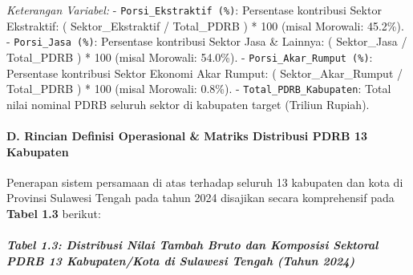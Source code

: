 \documentclass[
]{article}
\begin{document}
\emph{Keterangan Variabel:} - \texttt{Porsi\_Ekstraktif\ (\%)}:
Persentase kontribusi Sektor Ekstraktif: ( Sektor\_Ekstraktif /
Total\_PDRB ) * 100 (misal Morowali: 45.2\%). -
\texttt{Porsi\_Jasa\ (\%)}: Persentase kontribusi Sektor Jasa \&
Lainnya: ( Sektor\_Jasa / Total\_PDRB ) * 100 (misal Morowali: 54.0\%).
- \texttt{Porsi\_Akar\_Rumput\ (\%)}: Persentase kontribusi Sektor
Ekonomi Akar Rumput: ( Sektor\_Akar\_Rumput / Total\_PDRB ) * 100 (misal
Morowali: 0.8\%). - \texttt{Total\_PDRB\_Kabupaten}: Total nilai nominal
PDRB seluruh sektor di kabupaten target (Triliun Rupiah).

\paragraph{D. Rincian Definisi Operasional \& Matriks Distribusi PDRB 13
Kabupaten}\label{d.-rincian-definisi-operasional-matriks-distribusi-pdrb-13-kabupaten}

Penerapan sistem persamaan di atas terhadap seluruh 13 kabupaten dan
kota di Provinsi Sulawesi Tengah pada tahun 2024 disajikan secara
komprehensif pada \textbf{Tabel 1.3} berikut:

\subparagraph{Tabel 1.3: Distribusi Nilai Tambah Bruto dan Komposisi
Sektoral PDRB 13 Kabupaten/Kota di Sulawesi Tengah (Tahun
2024)}\label{tabel-1.3-distribusi-nilai-tambah-bruto-dan-komposisi-sektoral-pdrb-13-kabupatenkota-di-sulawesi-tengah-tahun-2024}
\end{document}
